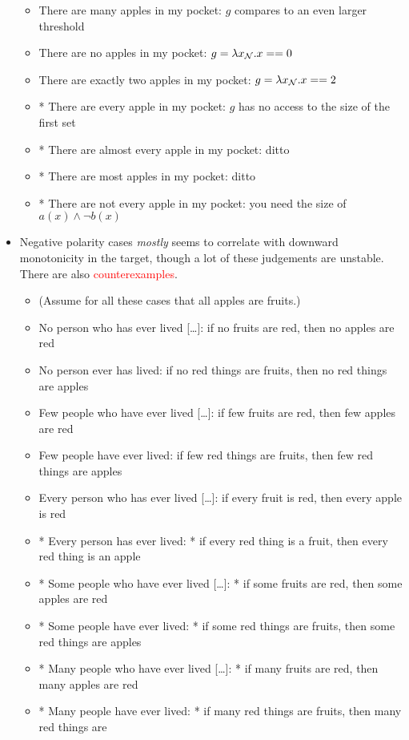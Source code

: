 \documentclass[a4paper]{article}
\begin{document}
\begin{itemize}
\begin{itemize}
  \item There are many apples in my pocket: $g$ compares to an even larger threshold
  \item There are no apples in my pocket: $g = \lambda x_{\mathcal{N}}. x == 0$
  \item There are exactly two apples in my pocket: $g = \lambda x_{\mathcal{N}}. x == 2$
  \item * There are every apple in my pocket: $g$ has no access to the size of the first set
  \item * There are almost every apple in my pocket: ditto
  \item * There are most apples in my pocket: ditto
  \item * There are not every apple in my pocket: you need the size of $a(x) \land \lnot b(x)$
  \end{itemize}
\item Negative polarity cases \emph{mostly} seems to correlate with downward monotonicity in the target,
  though a lot of these judgements are unstable. There are also \textcolor{red}{counterexamples}.
  \begin{itemize}
  \item (Assume for all these cases that all apples are fruits.)
  \item No person who has ever lived [\ldots]: if no fruits are red, then no apples are red
  \item No person ever has lived: if no red things are fruits, then no red things are apples
  \item Few people who have ever lived [\ldots]: if few fruits are red, then few apples are red
  \item Few people have ever lived: if few red things are fruits, then few red things are apples
  \item Every person who has ever lived [\ldots]: if every fruit is red, then every apple is red
  \item * Every person has ever lived: * if every red thing is a fruit, then every red thing is an apple
  \item * Some people who have ever lived [\ldots]: * if some fruits are red, then some apples are red
  \item * Some people have ever lived: * if some red things are fruits, then some red things are
    apples
  \item * Many people who have ever lived [\ldots]: * if many fruits are red, then many apples are red
  \item * Many people have ever lived: * if many red things are fruits, then many red things are

\end{itemize}
\end{itemize}
\end{document}
